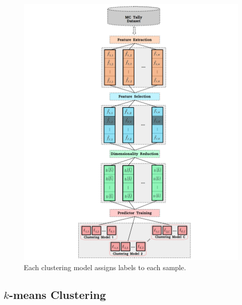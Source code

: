 \begin{figure}[h!]
\centering
\includegraphics[width=0.95\linewidth]{figures/unsupervised/features/engineering/cluster}
\vspace{2mm}
\caption[\textit{i}MGXS predictor training]{Each clustering model assigns labels to each sample.}
\label{fig:chap10-cluster}
\end{figure}


\subsection{$k$-means Clustering}
\label{subsec:chap10-kmeans}

